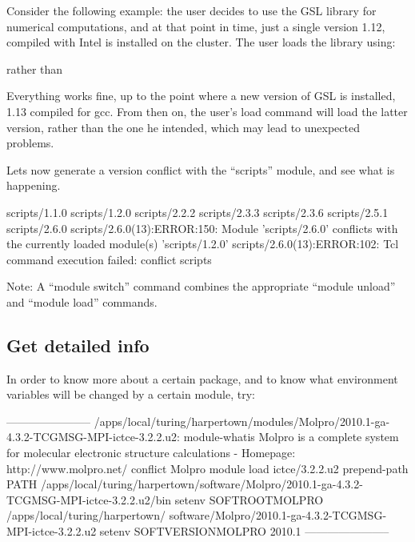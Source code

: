 Consider the following example: the user decides to use the GSL library for
numerical computations, and at that point in time, just a single version 1.12,
compiled with Intel is installed on the cluster. The user loads the library
using:

\begin{prompt}
\end{prompt}
rather than
\begin{prompt}
\end{prompt}

Everything works fine, up to the point where a new version of GSL is installed,
1.13 compiled for gcc. From then on, the user's load command will load the
latter version, rather than the one he intended, which may lead to unexpected
problems.

Lets now generate a version conflict with the ``scripts'' module, and see what
is happening.

\begin{prompt}
scripts/1.1.0
scripts/1.2.0
scripts/2.2.2
scripts/2.3.3
scripts/2.3.6
scripts/2.5.1
scripts/2.6.0
scripts/2.6.0(13):ERROR:150: Module 'scripts/2.6.0' conflicts with the currently loaded module(s) 'scripts/1.2.0'
scripts/2.6.0(13):ERROR:102: Tcl command execution failed: conflict scripts
\end{prompt}

Note: A ``module switch'' command combines the appropriate ``module unload''
and ``module load'' commands.

\subsection{Get detailed info}

In order to know more about a certain package, and to know what environment
variables will be changed by a certain module, try:

\begin{prompt}
-----------------------
/apps/local/turing/harpertown/modules/Molpro/2010.1-ga-4.3.2-TCGMSG-MPI-ictce-3.2.2.u2:
module-whatis Molpro is a complete system for molecular electronic structure calculations - Homepage: http://www.molpro.net/
conflict  Molpro
module  load ictce/3.2.2.u2
prepend-path  PATH  /apps/local/turing/harpertown/software/Molpro/2010.1-ga-4.3.2-TCGMSG-MPI-ictce-3.2.2.u2/bin
setenv     SOFTROOTMOLPRO /apps/local/turing/harpertown/
software/Molpro/2010.1-ga-4.3.2-TCGMSG-MPI-ictce-3.2.2.u2
setenv   SOFTVERSIONMOLPRO 2010.1
-----------------------
\end{prompt}

